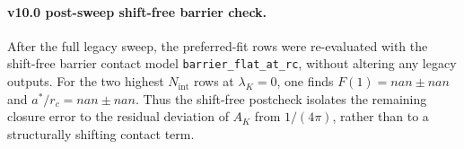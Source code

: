 \paragraph{v10.0 post-sweep shift-free barrier check.}
After the full legacy sweep, the preferred-fit rows were re-evaluated with the shift-free barrier contact model \texttt{barrier\_flat\_at\_rc}, without altering any legacy outputs. For the two highest $N_{\mathrm{int}}$ rows at $\lambda_K=0$, one finds $F(1) = nan \pm nan$ and $a^*/r_c = nan \pm nan$. Thus the shift-free postcheck isolates the remaining closure error to the residual deviation of $A_K$ from $1/(4\pi)$, rather than to a structurally shifting contact term.
